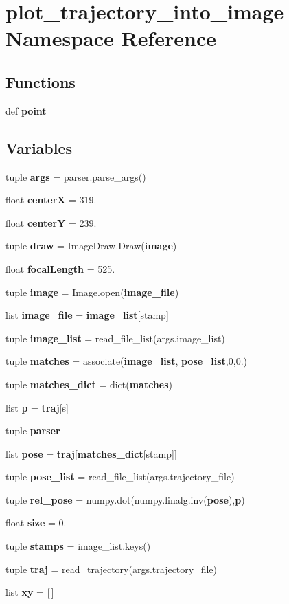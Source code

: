 \section{plot\-\_\-trajectory\-\_\-into\-\_\-image \-Namespace \-Reference}
\label{namespaceplot__trajectory__into__image}
\subsection*{\-Functions}
\begin{DoxyCompactItemize}
\item 
def {\bf point}
\end{DoxyCompactItemize}
\subsection*{\-Variables}
\begin{DoxyCompactItemize}
\item 
tuple {\bf args} = parser.\-parse\-\_\-args()
\item 
float {\bf center\-X} = 319.
\item 
float {\bf center\-Y} = 239.
\item 
tuple {\bf draw} = \-Image\-Draw.\-Draw({\bf image})
\item 
float {\bf focal\-Length} = 525.
\item 
tuple {\bf image} = \-Image.\-open({\bf image\-\_\-file})
\item 
list {\bf image\-\_\-file} = {\bf image\-\_\-list}[stamp]
\item 
tuple {\bf image\-\_\-list} = read\-\_\-file\-\_\-list(args.\-image\-\_\-list)
\item 
tuple {\bf matches} = associate({\bf image\-\_\-list}, {\bf pose\-\_\-list},0,0.)
\item 
tuple {\bf matches\-\_\-dict} = dict({\bf matches})
\item 
list {\bf p} = {\bf traj}[s]
\item 
tuple {\bf parser}
\item 
list {\bf pose} = {\bf traj}[{\bf matches\-\_\-dict}[stamp]]
\item 
tuple {\bf pose\-\_\-list} = read\-\_\-file\-\_\-list(args.\-trajectory\-\_\-file)
\item 
tuple {\bf rel\-\_\-pose} = numpy.\-dot(numpy.\-linalg.\-inv({\bf pose}),{\bf p})
\item 
float {\bf size} = 0.
\item 
tuple {\bf stamps} = image\-\_\-list.\-keys()
\item 
tuple {\bf traj} = read\-\_\-trajectory(args.\-trajectory\-\_\-file)
\item 
list {\bf xy} = [$\,$]
\end{DoxyCompactItemize}


